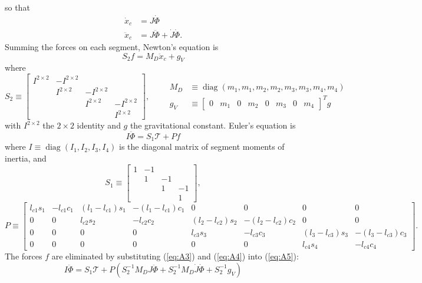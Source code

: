 \documentclass[11pt]{article}
\begin{document}
so that
\begin{align}
\dot{x}_c &= J\dot{\Phi} \label{eq:A2}\\
\ddot{x}_c &= J\ddot{\Phi} + \dot{J}\dot{\Phi}. \label{eq:A3}
\end{align}
Summing the forces on each segment, Newton's equation is
\begin{equation}
S_2 f = M_D\ddot{x}_c + g_V
\label{eq:A4}
\end{equation}
where
\[
S_2 \equiv \begin{bmatrix}
I^{2\times2} & -I^{2\times2} & & \\
& I^{2\times2} & -I^{2\times2} & \\
& & I^{2\times2} & -I^{2\times2}\\
& & & I^{2\times2}
\end{bmatrix},
\qquad
\begin{aligned}
M_D &\equiv \operatorname{diag}(m_1, m_1, m_2, m_2, m_3, m_3, m_4, m_4)\\
g_V &\equiv \begin{bmatrix}0 & m_1 & 0 & m_2 & 0 & m_3 & 0 & m_4
\end{bmatrix}^T g
\end{aligned}
\]
with $I^{2\times2}$ the $2\times2$ identity and $g$ the gravitational
constant. Euler's equation is
\begin{equation}
I\ddot{\Phi} = S_1\mathcal{T} + P f
\label{eq:A5}
\end{equation}
where $I\equiv\operatorname{diag}(I_1,I_2,I_3,I_4)$ is the diagonal matrix of
segment moments of inertia, and
\[
S_1 \equiv \begin{bmatrix}
1 & -1 & & \\
& 1 & -1 & \\
& & 1 & -1\\
& & & 1
\end{bmatrix},
\]
{\footnotesize\setlength{\arraycolsep}{2.5pt}
\[
P \equiv \begin{bmatrix}
l_{c1}s_1 & -l_{c1}c_1 & (l_1-l_{c1})s_1 & -(l_1-l_{c1})c_1
& 0 & 0 & 0 & 0\\
0 & 0 & l_{c2}s_2 & -l_{c2}c_2
& (l_2-l_{c2})s_2 & -(l_2-l_{c2})c_2 & 0 & 0\\
0 & 0 & 0 & 0 & l_{c3}s_3 & -l_{c3}c_3
& (l_3-l_{c3})s_3 & -(l_3-l_{c3})c_3\\
0 & 0 & 0 & 0 & 0 & 0 & l_{c4}s_4 & -l_{c4}c_4
\end{bmatrix}.
\]}
The forces $f$ are eliminated by substituting (\ref{eq:A3}) and (\ref{eq:A4})
into (\ref{eq:A5}):
\begin{equation}
I\ddot{\Phi} = S_1\mathcal{T}
+ P(S_2^{-1} M_D J\ddot{\Phi}
+ S_2^{-1} M_D\dot{J}\dot{\Phi} + S_2^{-1} g_V)
\label{eq:A6}
\end{equation}
\end{document}
